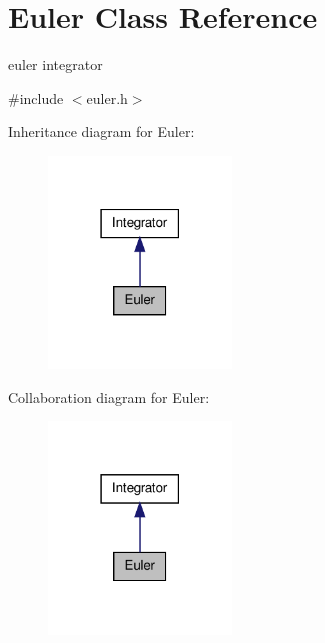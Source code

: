 \hypertarget{classEuler}{\section{\-Euler \-Class \-Reference}
\label{classEuler}
}


euler integrator  




{\ttfamily \#include $<$euler.\-h$>$}



\-Inheritance diagram for \-Euler\-:
\nopagebreak
\begin{figure}[H]
\begin{center}
\leavevmode
\includegraphics[width=138pt]{classEuler__inherit__graph}
\end{center}
\end{figure}


\-Collaboration diagram for \-Euler\-:
\nopagebreak
\begin{figure}[H]
\begin{center}
\leavevmode
\includegraphics[width=138pt]{classEuler__coll__graph}
\end{center}
\end{figure}
